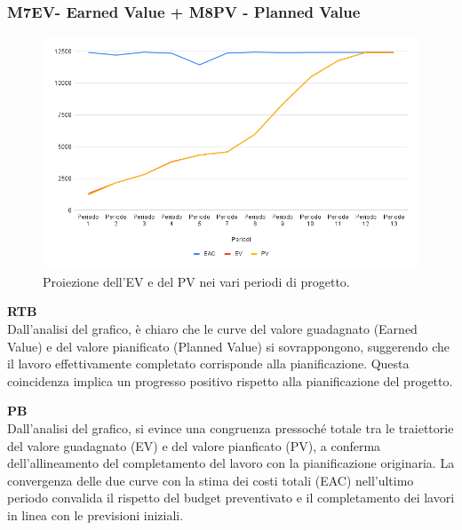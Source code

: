 \subsubsection{M7EV- Earned Value + M8PV - Planned Value} 

\vspace{0.3cm}

\begin{figure}[H]
    \centering
    \includegraphics[width=1\textwidth]{../Images/PianoDiQualifica/EV_PV.png}
    \caption{Proiezione dell’EV e del PV nei vari periodi di progetto.}
    \label{fig:3}
\end{figure}

\vspace{0.2cm}

\textbf{RTB} \\
Dall'analisi del grafico, è chiaro che le curve del valore guadagnato (Earned Value) e del valore pianificato (Planned Value) si sovrappongono, suggerendo che il lavoro effettivamente completato corrisponde alla pianificazione. 
Questa coincidenza implica un progresso positivo rispetto alla pianificazione del progetto.

\vspace{0.3cm}

\textbf{PB} \\ 
Dall'analisi del grafico, si evince una congruenza pressoché totale tra le traiettorie del valore guadagnato (EV) e del valore pianficato (PV), a conferma dell'allineamento del completamento del lavoro con la pianificazione originaria.
La convergenza delle due curve con la stima dei costi totali (EAC) nell'ultimo periodo convalida il rispetto del budget preventivato e il completamento dei lavori in linea con le previsioni iniziali.

